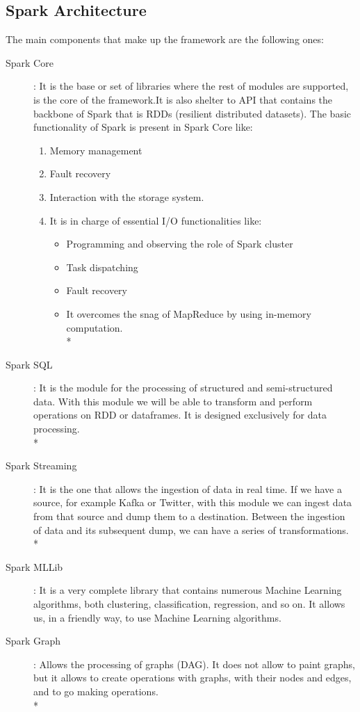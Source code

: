 \subsection{Spark Architecture}

The main components that make up the framework are the following ones:

\begin{description}

	\item[Spark Core]: It is the base or set of libraries where the rest of modules are supported, is the core of the framework.It is also shelter to API that contains the backbone of Spark that is RDDs (resilient distributed datasets). The basic functionality of Spark is present in Spark Core like:
	\begin{enumerate}
		\item Memory management
		\item Fault recovery
		\item Interaction with the storage system.
		\item It is in charge of essential I/O functionalities like:
		\begin{itemize}
			\item Programming and observing the role of Spark cluster
			\item Task dispatching
			\item Fault recovery
			\item It overcomes the snag of MapReduce by using in-memory computation.\\*
		\end{itemize}
	\end{enumerate}

	

	
	
	\item[Spark SQL]: It is the module for the processing of structured and semi-structured data. With this module we will be able to transform and perform operations on RDD or dataframes. It is designed exclusively for data processing.\\*
	
	
	\item[Spark Streaming]: It is the one that allows the ingestion of data in real time. If we have a source, for example Kafka or Twitter, with this module we can ingest data from that source and dump them to a destination. Between the ingestion of data and its subsequent dump, we can have a series of transformations.\\*
	
	
	\item[Spark MLLib]: It is a very complete library that contains numerous Machine Learning algorithms, both clustering, classification, regression, and so on. It allows us, in a friendly way, to use Machine Learning algorithms.
	
	
	\item[Spark Graph]: Allows the processing of graphs (DAG). It does not allow to paint graphs, but it allows to create operations with graphs, with their nodes and edges, and to go making operations.\\*
	
\end{description}


